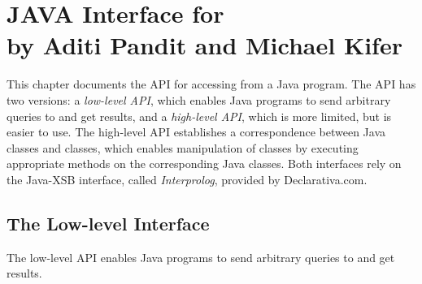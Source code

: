 

\chapter[JAVA Interface for \FLORA]{JAVA Interface for \FLORA\\by Aditi
      Pandit and Michael Kifer}


     This chapter documents the API for accessing \FLORA from a Java program.
  The API has two versions: a \emph{low-level API},
  which enables Java programs to
  send arbitrary queries to \FLORA and get results, and a \emph{high-level
    API}, which is more limited, but is easier to use. The high-level API
  establishes a correspondence between Java classes and \FLORA classes,
  which enables manipulation of \FLORA classes by executing appropriate
  methods on the corresponding Java classes. Both interfaces rely on the
  Java-XSB interface, called \emph{Interprolog}, provided by Declarativa.com.


\section{The Low-level Interface}
 The low-level API enables Java programs to send arbitrary queries
to \FLORA and get results. 

